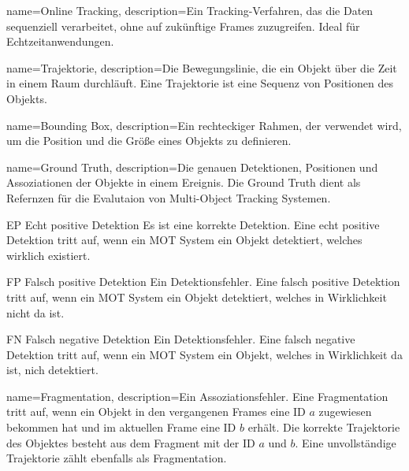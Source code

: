 {
name=Online Tracking,
description={Ein Tracking-Verfahren, das die Daten sequenziell verarbeitet, ohne auf zukünftige Frames zuzugreifen. Ideal für Echtzeitanwendungen.}
}

{
name=Trajektorie,
description={Die Bewegungslinie, die ein Objekt über die Zeit in einem Raum durchläuft. Eine Trajektorie ist eine Sequenz von Positionen des Objekts.}
}

{
name=Bounding Box,
description={Ein rechteckiger Rahmen, der verwendet wird, um die Position und die Größe eines Objekts zu definieren.}
}

{
name=Ground Truth,
description={Die genauen Detektionen, Positionen und Assoziationen der Objekte in einem Ereignis. Die Ground Truth dient als Refernzen für die Evalutaion von Multi-Object Tracking Systemen.}
}




\newglossaryentrywithacronym
{EP}
{Echt positive Detektion}
{Es ist eine korrekte Detektion. Eine echt positive Detektion tritt auf, wenn ein MOT System ein Objekt detektiert, welches wirklich existiert.}

\newglossaryentrywithacronym
{FP}
{Falsch positive Detektion}
{Ein Detektionsfehler. Eine falsch positive Detektion tritt auf, wenn ein MOT System ein Objekt detektiert, welches in Wirklichkeit nicht da ist.}

\newglossaryentrywithacronym
{FN}
{Falsch negative Detektion}
{Ein Detektionsfehler. Eine falsch negative Detektion tritt auf, wenn ein MOT System ein Objekt, welches in Wirklichkeit da ist, nich detektiert.}

{
name=Fragmentation,
description={Ein Assoziationsfehler. Eine Fragmentation tritt auf, wenn ein Objekt in den vergangenen Frames eine ID \(a\) zugewiesen bekommen hat und im aktuellen Frame eine ID \(b\) erhält. Die korrekte Trajektorie des Objektes besteht aus dem Fragment mit der ID \(a\) und \(b\). Eine unvollständige Trajektorie zählt ebenfalls als Fragmentation.}
}

